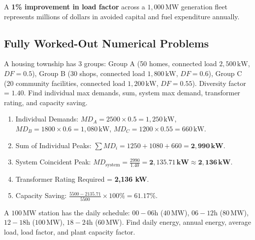 \documentclass[11pt,a4paper]{article}
\newenvironment{Tip}[1][Key Engineering Insight]{\begin{tcolorbox}[tipbox, title=#1]}{\end{tcolorbox}}
\newenvironment{Problem}[1][Numerical Problem]{\begin{tcolorbox}[problembox, title=#1]}{\end{tcolorbox}}
\newenvironment{Solution}[1][Step-by-Step Solution]{\begin{tcolorbox}[solbox, title=#1]}{\end{tcolorbox}}
\begin{document}
\begin{Tip}[The Power Engineer's Mandate]
A \textbf{1\% improvement in load factor} across a $1,000\,\text{MW}$ generation fleet represents millions of dollars in avoided capital and fuel expenditure annually.
\end{Tip}

\subsection{Fully Worked-Out Numerical Problems}

\begin{Problem}[Problem 1: Residential Distribution Feeder \& Capacity Sizing]
A housing township has 3 groups: Group A (50 homes, connected load $2,500\,\text{kW}$, $DF = 0.5$), Group B (30 shops, connected load $1,800\,\text{kW}$, $DF = 0.6$), Group C (20 community facilities, connected load $1,200\,\text{kW}$, $DF = 0.55$). Diversity factor = $1.40$. Find individual max demands, sum, system max demand, transformer rating, and capacity saving.
\end{Problem}

\begin{Solution}
\begin{enumerate}
  \item Individual Demands:
    $MD_A = 2500 \times 0.5 = 1,250\,\text{kW}$,
    $MD_B = 1800 \times 0.6 = 1,080\,\text{kW}$,
    $MD_C = 1200 \times 0.55 = 660\,\text{kW}$.
  \item Sum of Individual Peaks: $\sum MD_i = 1250 + 1080 + 660 = \mathbf{2,990\,\text{kW}}$.
  \item System Coincident Peak: $MD_{\text{system}} = \frac{2990}{1.40} = \mathbf{2,135.71\,\text{kW}} \approx \mathbf{2,136\,\text{kW}}$.
  \item Transformer Rating Required = \textbf{2,136 kW}.
  \item Capacity Saving: $\frac{5500 - 2135.71}{5500} \times 100\% = \mathbf{61.17\%}$.
\end{enumerate}
\end{Solution}

\begin{Problem}[Problem 2: Daily Step-Load Schedule Analysis]
A $100\,\text{MW}$ station has the daily schedule: $00-06\text{h}$ ($40\,\text{MW}$), $06-12\text{h}$ ($80\,\text{MW}$), $12-18\text{h}$ ($100\,\text{MW}$), $18-24\text{h}$ ($60\,\text{MW}$). Find daily energy, annual energy, average load, load factor, and plant capacity factor.
\end{Problem}
\end{document}
